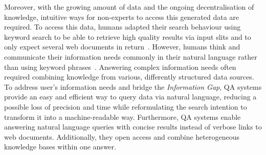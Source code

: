 Moreover, with the growing amount of data and the ongoing decentralisation of knowledge, intuitive ways for non-experts to access this generated data are required. 
To access this data, humans adapted their search behaviour using keyword search to be able to retrieve high quality results via input slits and to only expect several web documents in return~\cite{ilprints361}.
However, humans think and communicate their information needs commonly in their natural language rather than using keyword phrases~\cite{woods1973progress}. 
Answering complex information needs often required combining knowledge from various, differently structured data sources.
To address user's information needs and bridge the \emph{Information Gap}, \ac{QA} systems provide an easy and efficient way to query data via natural language, reducing a possible loss of precision and time while reformulating the search intention to transform it into a machine-readable way.
Furthermore, QA systems enable answering natural language queries with concise results instead of verbose links to web documents. 
Additionally, they open access and combine heterogeneous knowledge bases within one answer.

